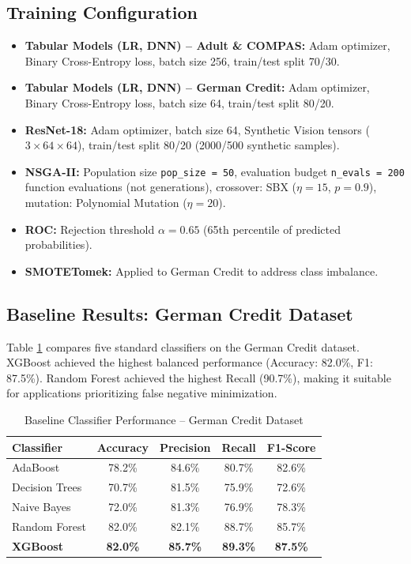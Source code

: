 \documentclass[12pt,a4paper]{article}
\begin{document}
\subsection{Training Configuration}

\begin{itemize}
    \item \textbf{Tabular Models (LR, DNN) -- Adult \& COMPAS:} Adam optimizer, Binary Cross-Entropy loss, batch size 256, train/test split 70/30.
    \item \textbf{Tabular Models (LR, DNN) -- German Credit:} Adam optimizer, Binary Cross-Entropy loss, batch size 64, train/test split 80/20.
    \item \textbf{ResNet-18:} Adam optimizer, batch size 64, Synthetic Vision tensors ($3 \times 64 \times 64$), train/test split 80/20 (2000/500 synthetic samples).
    \item \textbf{NSGA-II:} Population size \texttt{pop\_size = 50}, evaluation budget \texttt{n\_evals = 200} function evaluations (not generations), crossover: SBX ($\eta=15$, $p=0.9$), mutation: Polynomial Mutation ($\eta=20$).
    \item \textbf{ROC:} Rejection threshold $\alpha = 0.65$ (65th percentile of predicted probabilities).
    \item \textbf{SMOTETomek:} Applied to German Credit to address class imbalance.
\end{itemize}

\subsection{Baseline Results: German Credit Dataset}

Table \ref{tab:baseline_german} compares five standard classifiers on the German Credit dataset. XGBoost achieved the highest balanced performance (Accuracy: 82.0\%, F1: 87.5\%). Random Forest achieved the highest Recall (90.7\%), making it suitable for applications prioritizing false negative minimization. \cite{nagpal2024multiobj}

\begin{table}[h]
\centering
\caption{Baseline Classifier Performance -- German Credit Dataset}
\label{tab:baseline_german}
\begin{tabular}{lcccc}
\toprule
\textbf{Classifier} & \textbf{Accuracy} & \textbf{Precision} & \textbf{Recall} & \textbf{F1-Score} \\
\midrule
AdaBoost        & 78.2\% & 84.6\% & 80.7\% & 82.6\% \\
Decision Trees  & 70.7\% & 81.5\% & 75.9\% & 72.6\% \\
Naive Bayes     & 72.0\% & 81.3\% & 76.9\% & 78.3\% \\
Random Forest   & 82.0\% & 82.1\% & 88.7\% & 85.7\% \\
\textbf{XGBoost} & \textbf{82.0\%} & \textbf{85.7\%} & \textbf{89.3\%} & \textbf{87.5\%} \\
\bottomrule
\end{tabular}
\end{table}
\newpage
\end{document}
